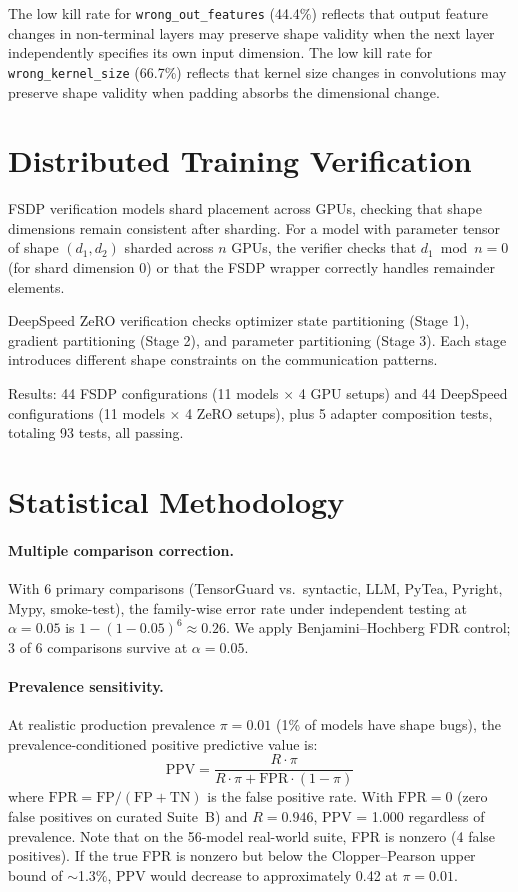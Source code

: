 \documentclass[11pt]{article}
\begin{document}
The low kill rate for \texttt{wrong\_out\_features} (44.4\%)
reflects that output feature changes in non-terminal layers may
preserve shape validity when the next layer independently specifies
its own input dimension.
The low kill rate for \texttt{wrong\_kernel\_size} (66.7\%)
reflects that kernel size changes in convolutions may preserve
shape validity when padding absorbs the dimensional change.


\section{Distributed Training Verification}\label{app:distributed}

FSDP verification models shard placement across GPUs, checking
that shape dimensions remain consistent after sharding.  For a model
with parameter tensor of shape $(d_1, d_2)$ sharded across $n$ GPUs,
the verifier checks that $d_1 \bmod n = 0$ (for shard dimension 0)
or that the FSDP wrapper correctly handles remainder elements.

DeepSpeed ZeRO verification checks optimizer state partitioning
(Stage 1), gradient partitioning (Stage 2), and parameter
partitioning (Stage 3).  Each stage introduces different
shape constraints on the communication patterns.

Results: 44 FSDP configurations (11 models $\times$ 4 GPU setups)
and 44 DeepSpeed configurations (11 models $\times$ 4 ZeRO setups),
plus 5 adapter composition tests, totaling 93 tests, all passing.


\section{Statistical Methodology}\label{app:stat-method}

\paragraph{Multiple comparison correction.}
With 6 primary comparisons (TensorGuard vs.\ syntactic, LLM, PyTea,
Pyright, Mypy, smoke-test), the family-wise error rate under
independent testing at $\alpha = 0.05$ is
$1 - (1-0.05)^6 \approx 0.26$.  We apply Benjamini--Hochberg
FDR control; 3 of 6 comparisons survive at $\alpha = 0.05$.

\paragraph{Prevalence sensitivity.}
At realistic production prevalence $\pi = 0.01$ (1\% of models
have shape bugs), the prevalence-conditioned positive predictive
value is:
\[
  \text{PPV} = \frac{R \cdot \pi}{R \cdot \pi + \text{FPR} \cdot (1-\pi)}
\]
where $\text{FPR} = \text{FP}/(\text{FP}+\text{TN})$ is the false positive rate.
With $\text{FPR} = 0$ (zero false positives on curated Suite~B) and $R = 0.946$, PPV = 1.000
regardless of prevalence.  Note that on the 56-model real-world
suite, FPR is nonzero (4 false positives).  If the true FPR is
nonzero but below the Clopper--Pearson upper bound of
$\sim$1.3\%, PPV would decrease to approximately 0.42 at
$\pi = 0.01$.
\end{document}
